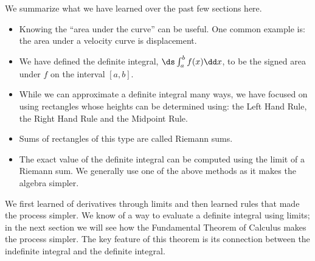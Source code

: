 We summarize what we have learned over the past few sections here.
\begin{itemize}
\item	Knowing the ``area under the curve'' can be useful. One common example is: the area under a velocity curve is displacement.
\item	We have defined the definite integral, $\ds\int_a^b f(x)\dd x$, to be the signed area under $f$ on the interval $[a,b]$. 
\item	While we can approximate a definite integral many ways, we have focused on using rectangles whose heights can be determined using: the Left Hand Rule, the Right Hand Rule and the Midpoint Rule. 
\item	Sums of rectangles of this type are called Riemann sums.
\item	The exact value of the definite integral can be computed using the limit of a Riemann sum. We generally use one of the above methods as it makes the algebra simpler.
\end{itemize}

We first learned of derivatives through limits and then learned rules that made the process simpler. We know of a way to evaluate a definite integral using limits; in the next section we will see how the Fundamental Theorem of Calculus makes the process simpler. The key feature of this theorem is its connection between the indefinite integral and the definite integral.


